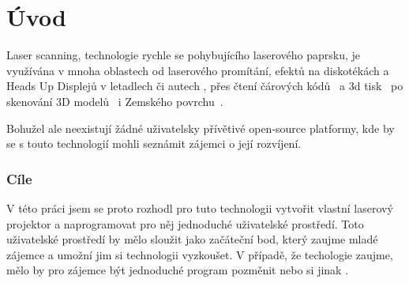 \chapter*{Úvod}
Laser scanning, technologie rychle se pohybujícího laserového paprsku, je využívána v mnoha oblastech od laserového promítání, efektů na diskotékách a Heads Up Displejů v letadlech či autech \cite{huds-in-driving}, přes čtení čárových kódů~\cite{history-of-barcode-scanning} a 3d tisk~\cite{Photo-curing-3D-printing} po skenování 3D modelů~\cite{3d-model-scan} i Zemského povrchu~\cite{heightmaps}.

Bohužel ale neexistují žádné uživatelsky přívětivé open-source platformy, kde by se s touto technologií mohli seznámit zájemci o její rozvíjení.

\subsection*{Cíle}
V této práci jsem se proto rozhodl pro tuto technologii vytvořit vlastní laserový projektor a naprogramovat pro něj jednoduché uživatelské prostředí.
Toto uživatelské prostředí by mělo sloužit jako začáteční bod, který zaujme mladé zájemce a umožní jim si technologii vyzkoušet.
V případě, že techologie zaujme, mělo by pro zájemce být jednoduché program pozměnit nebo si jinak .
